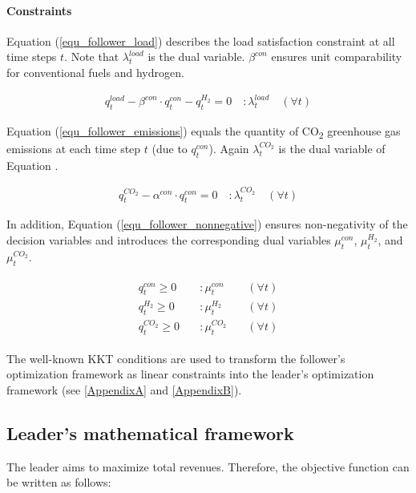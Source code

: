 \documentclass[review]{elsarticle}
\begin{document}
\paragraph{Constraints} Equation (\ref{equ_follower_load}) describes the load satisfaction constraint at all time steps $t$. Note that $\lambda_{t}^{load}$ is the dual variable. $\beta^{con}$ ensures unit comparability for conventional fuels and hydrogen.

\begin{align}\label{equ_follower_load}
q_{t}^{load} - \beta^{con} \cdot q_{t}^{con} - q_{t}^{H_2} = 0 \quad :\lambda_{t}^{load} \quad (\forall t)
\end{align}

Equation (\ref{equ_follower_emissions}) equals the quantity of CO\textsubscript{2} greenhouse gas emissions at each time step $t$ (due to $q_{t}^{con}$). Again $\lambda_{t}^{CO_2}$ is the dual variable of Equation .

\begin{align}\label{equ_follower_emissions}
q_{t}^{CO_2} - \alpha^{con} \cdot q_{t}^{con} = 0 \quad :\lambda_{t}^{CO_2} \quad (\forall t)
\end{align}

In addition, Equation (\ref{equ_follower_nonnegative}) ensures non-negativity of the decision variables and introduces the corresponding dual variables $\mu_t^{con}$, $\mu_t^{H_2}$, and $\mu_t^{CO_2}$.

\begin{align}\label{equ_follower_nonnegative}
\begin{aligned}
q_{t}^{con} \geq 0 & \quad:\mu_t^{con} & \quad(\forall t)\\
q_{t}^{H_2} \geq 0 & \quad:\mu_t^{H_2} & \quad(\forall t)\\
q_{t}^{CO_2} \geq 0 & \quad:\mu_t^{CO_2} & \quad(\forall t)
\end{aligned}
\end{align}

The well-known KKT conditions are used to transform the follower's optimization framework as linear constraints into the leader's optimization framework (see \ref{AppendixA} and \ref{AppendixB}).

\subsection{Leader's mathematical framework}\label{sec:leader}
The leader aims to maximize total revenues. Therefore, the objective function can be written as follows: 
\end{document}
